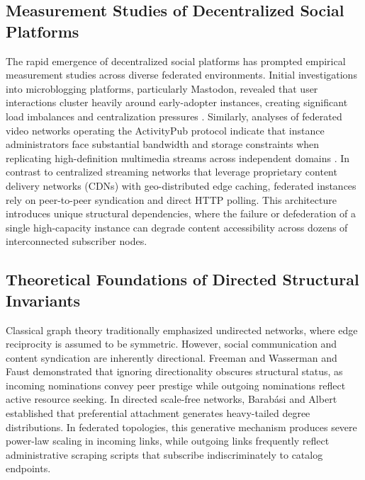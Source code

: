 \documentclass[conference]{IEEEtran}
\begin{document}
\subsection{Measurement Studies of Decentralized Social Platforms}
The rapid emergence of decentralized social platforms has prompted empirical measurement studies across diverse federated environments. Initial investigations into microblogging platforms, particularly Mastodon, revealed that user interactions cluster heavily around early-adopter instances, creating significant load imbalances and centralization pressures \cite{newman2003structure}. Similarly, analyses of federated video networks operating the ActivityPub protocol indicate that instance administrators face substantial bandwidth and storage constraints when replicating high-definition multimedia streams across independent domains \cite{damie2026fedivertex}. In contrast to centralized streaming networks that leverage proprietary content delivery networks (CDNs) with geo-distributed edge caching, federated instances rely on peer-to-peer syndication and direct HTTP polling. This architecture introduces unique structural dependencies, where the failure or defederation of a single high-capacity instance can degrade content accessibility across dozens of interconnected subscriber nodes.

\subsection{Theoretical Foundations of Directed Structural Invariants}
Classical graph theory traditionally emphasized undirected networks, where edge reciprocity is assumed to be symmetric. However, social communication and content syndication are inherently directional. Freeman \cite{freeman1978centrality} and Wasserman and Faust \cite{wasserman1994social} demonstrated that ignoring directionality obscures structural status, as incoming nominations convey peer prestige while outgoing nominations reflect active resource seeking. In directed scale-free networks, Barab\'asi and Albert \cite{barabasi1999emergence} established that preferential attachment generates heavy-tailed degree distributions. In federated topologies, this generative mechanism produces severe power-law scaling in incoming links, while outgoing links frequently reflect administrative scraping scripts that subscribe indiscriminately to catalog endpoints.
\end{document}

